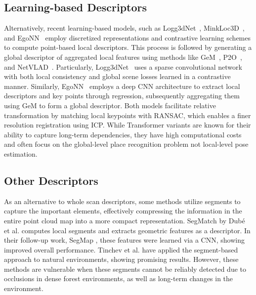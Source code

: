 \subsection*{Learning-based Descriptors} 
Alternatively, recent learning-based models, such as Logg3dNet~\cite{vidanapathirana2022icra}, MinkLoc3D~\cite{komorowski2021wacv}, and EgoNN~\cite{komorowski2022ral} employ discretized representations and contrastive learning schemes to compute point-based local descriptors. This process is followed by generating a global descriptor of aggregated local features using methods like GeM~\cite{radenovic2019pami}, P2O~\cite{vidanapathirana2021icra}, and NetVLAD~\cite{arandjelovic2018pami}.  
Particularly, Logg3dNet~\cite{vidanapathirana2022icra} uses a sparse convolutional network with both local consistency and global scene losses learned in a contrastive manner. Similarly, EgoNN~\cite{komorowski2022ral} employs a deep CNN architecture to extract local descriptors and key points through regression, subsequently aggregating them using GeM to form a global descriptor.
Both models facilitate relative transformation by matching local keypoints with RANSAC, which enables a finer resolution registration using ICP. 
While Transformer variants \cite{zhang2019cvpr, xia2021cvpr, zhou2021icra, xu2021transloc3d} are known for their ability to capture long-term dependencies, they have high computational costs and often focus on the global-level place recognition problem not local-level pose estimation.

\subsection*{Other Descriptors} 
As an alternative to whole scan descriptors, some methods utilize segments to capture the important elements, effectively compressing the information in the entire point cloud map into a more compact representation. SegMatch \cite{dube2017icra} by Dubé et al. computes local segments and extracts geometric features as a descriptor. In their follow-up work, SegMap \cite{dube2018rss}, these features were learned via a CNN, showing improved overall performance. Tinchev et al. \cite{tinchev2018iros, tinchev2019ral} have applied the segment-based approach to natural environments, showing promising results. However, these methods are vulnerable when these segments cannot be reliably detected due to occlusions in dense forest environments, as well as long-term changes in the environment.


